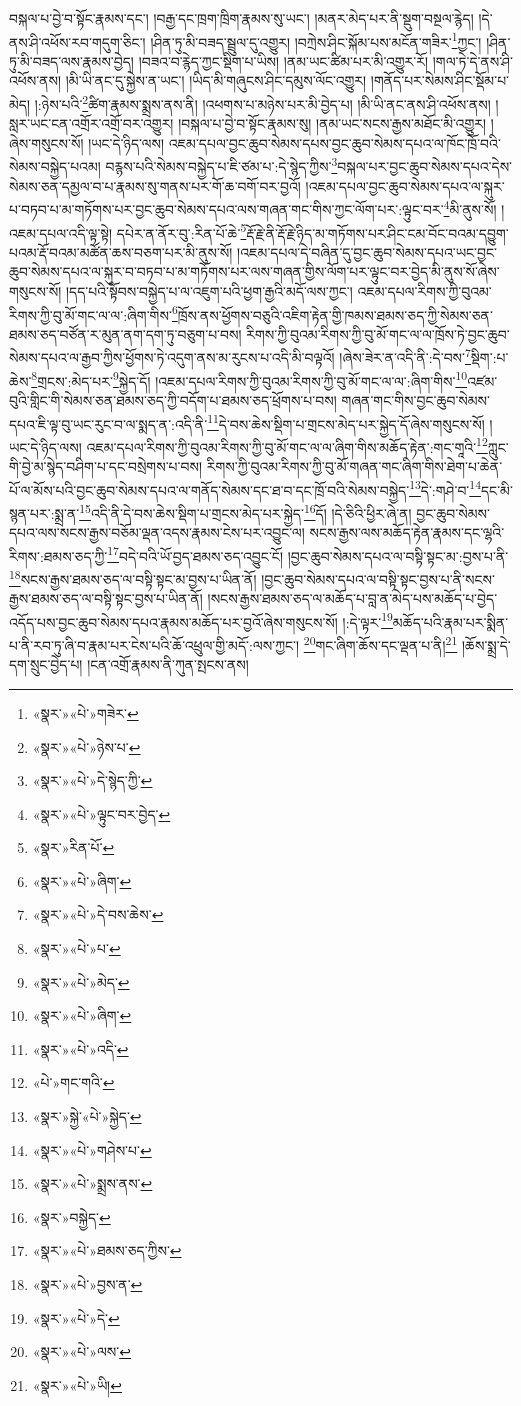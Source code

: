བསྐལ་པ་བྱེ་བ་སྟོང་རྣམས་དང་། །བརྒྱ་དང་ཁྲག་ཁྲིག་རྣམས་སུ་ཡང་། །མནར་མེད་པར་ནི་སྡུག་བསྔལ་རྙེད། །དེ་ནས་ཤི་འཕོས་རབ་གདུག་ཅིང་། །ཤིན་ཏུ་མི་བཟད་སྦྲུལ་དུ་འགྱུར། །བཀྲེས་ཤིང་སྐོམ་པས་མངོན་གཟིར་\footnote{«སྣར་»«པེ་»གཟེར་}ཀྱང་། །ཤིན་ཏུ་མི་བཟད་ལས་རྣམས་བྱེད། །བཟའ་བ་རྙེད་ཀྱང་སྡིག་པ་ཡིས། །ནམ་ཡང་ཚིམ་པར་མི་འགྱུར་རོ། །གལ་ཏེ་དེ་ནས་ཤི་འཕོས་ནས། །མི་ཡི་ནང་དུ་སྐྱེས་ན་ཡང་། །ཡིད་མི་གཞུངས་ཤིང་དམུས་ལོང་འགྱུར། །གནོད་པར་སེམས་ཤིང་སྡོམ་པ་མེད། །:ཉེས་པའི་\footnote{«སྣར་»«པེ་»ཉེས་པ་}ཚིག་རྣམས་སྨྲས་ནས་ནི། །འཕགས་པ་མཉེས་པར་མི་བྱེད་པ། །མི་ཡི་ནང་ནས་ཤི་འཕོས་ནས། །སླར་ཡང་ངན་འགྲོར་འགྲོ་བར་འགྱུར། །བསྐལ་པ་བྱེ་བ་སྟོང་རྣམས་སུ། །ནམ་ཡང་སངས་རྒྱས་མཐོང་མི་འགྱུར། །ཞེས་གསུངས་སོ། །ཡང་དེ་ཉིད་ལས། འཇམ་དཔལ་བྱང་ཆུབ་སེམས་དཔས་བྱང་ཆུབ་སེམས་དཔའ་ལ་ཁོང་ཁྲོ་བའི་སེམས་བསྐྱེད་པའམ། བརྙས་པའི་སེམས་བསྐྱེད་པ་ཇི་ཙམ་པ་:དེ་སྙེད་ཀྱིས་\footnote{«སྣར་»«པེ་»དེ་སྙེད་ཀྱི་}བསྐལ་པར་བྱང་ཆུབ་སེམས་དཔའ་དེས་སེམས་ཅན་དམྱལ་བ་པ་རྣམས་སུ་གནས་པར་གོ་ཆ་བགོ་བར་བྱའོ། །འཇམ་དཔལ་བྱང་ཆུབ་སེམས་དཔའ་ལ་སྐུར་པ་བཏབ་པ་མ་གཏོགས་པར་བྱང་ཆུབ་སེམས་དཔའ་ལས་གཞན་གང་གིས་ཀྱང་ལོག་པར་:ལྟུང་བར་\footnote{«སྣར་»«པེ་»ལྟུང་བར་བྱེད་}མི་ནུས་སོ། །འཇམ་དཔལ་འདི་ལྟ་སྟེ། དཔེར་ན་ནོར་བུ་:རིན་པོ་ཆེ་\footnote{«སྣར་»རིན་པོ་}རྡོ་རྗེ་ནི་རྡོ་རྗེ་ཉིད་མ་གཏོགས་པར་ཤིང་ངམ་བོང་བའམ་དབྱུག་པའམ་རྡོ་བའམ་མཚོན་ཆས་བཅག་པར་མི་ནུས་སོ། །འཇམ་དཔལ་དེ་བཞིན་དུ་བྱང་ཆུབ་སེམས་དཔའ་ཡང་བྱང་ཆུབ་སེམས་དཔའ་ལ་སྐུར་བ་བཏབ་པ་མ་གཏོགས་པར་ལས་གཞན་གྱིས་ལོག་པར་ལྟུང་བར་བྱེད་མི་ནུས་སོ་ཞེས་གསུངས་སོ། །དད་པའི་སྟོབས་བསྐྱེད་པ་ལ་འཇུག་པའི་ཕྱག་རྒྱའི་མདོ་ལས་ཀྱང་། འཇམ་དཔལ་རིགས་ཀྱི་བུའམ་རིགས་ཀྱི་བུ་མོ་གང་ལ་ལ་:ཞིག་གིས་\footnote{«སྣར་»«པེ་»ཞིག་}ཁྲོས་ནས་ཕྱོགས་བཅུའི་འཇིག་རྟེན་གྱི་ཁམས་ཐམས་ཅད་ཀྱི་སེམས་ཅན་ཐམས་ཅད་བཙོན་ར་མུན་ནག་དག་ཏུ་བཅུག་པ་བས། རིགས་ཀྱི་བུའམ་རིགས་ཀྱི་བུ་མོ་གང་ལ་ལ་ཁྲོས་ཏེ་བྱང་ཆུབ་སེམས་དཔའ་ལ་རྒྱབ་ཀྱིས་ཕྱོགས་ཏེ་འདུག་ནས་མ་རུངས་པ་འདི་མི་བལྟའོ། །ཞེས་ཟེར་ན་འདི་ནི་:དེ་བས་\footnote{«སྣར་»«པེ་»དེ་བས་ཆེས་}སྡིག་:པ་ཆེས་\footnote{«སྣར་»«པེ་»པ་}གྲངས་:མེད་པར་\footnote{«སྣར་»«པེ་»མེད་}སྐྱེད་དོ། །འཇམ་དཔལ་རིགས་ཀྱི་བུའམ་རིགས་ཀྱི་བུ་མོ་གང་ལ་ལ་:ཞིག་གིས་\footnote{«སྣར་»«པེ་»ཞིག་}འཛམ་བུའི་གླིང་གི་སེམས་ཅན་ཐམས་ཅད་ཀྱི་བདོག་པ་ཐམས་ཅད་ཕྲོགས་པ་བས། གཞན་གང་གིས་བྱང་ཆུབ་སེམས་དཔའ་ཇི་ལྟ་བུ་ཡང་རུང་བ་ལ་སྨད་ན་:འདི་ནི་\footnote{«སྣར་»«པེ་»འདི་}དེ་བས་ཆེས་སྡིག་པ་གྲངས་མེད་པར་སྐྱེད་དོ་ཞེས་གསུངས་སོ། །ཡང་དེ་ཉིད་ལས། འཇམ་དཔལ་རིགས་ཀྱི་བུའམ་རིགས་ཀྱི་བུ་མོ་གང་ལ་ལ་ཞིག་གིས་མཆོད་རྟེན་:གང་གཱའི་\footnote{«པེ་»གང་གའི་}ཀླུང་གི་བྱེ་མ་སྙེད་བཤིག་པ་དང་བསྲེགས་པ་བས། རིགས་ཀྱི་བུའམ་རིགས་ཀྱི་བུ་མོ་གཞན་གང་ཞིག་གིས་ཐེག་པ་ཆེན་པོ་ལ་མོས་པའི་བྱང་ཆུབ་སེམས་དཔའ་ལ་གནོད་སེམས་དང་ཐ་བ་དང་ཁྲོ་བའི་སེམས་བསྐྱེད་\footnote{«སྣར་»སྐྱེ་«པེ་»སྐྱེད་}དེ་:གཤེ་བ་\footnote{«སྣར་»«པེ་»གཤེས་པ་}དང་མི་སྙན་པར་:སྨྲ་ན་\footnote{«སྣར་»«པེ་»སྨྲས་ནས་}འདི་ནི་དེ་བས་ཆེས་སྡིག་པ་གྲངས་མེད་པར་སྐྱེད་\footnote{«སྣར་»བསྐྱེད་}དོ། །དེ་ཅིའི་ཕྱིར་ཞེ་ན། བྱང་ཆུབ་སེམས་དཔའ་ལས་སངས་རྒྱས་བཅོམ་ལྡན་འདས་རྣམས་ངེས་པར་འབྱུང་ལ། སངས་རྒྱས་ལས་མཆོད་རྟེན་རྣམས་དང་ལྷའི་རིགས་:ཐམས་ཅད་ཀྱི་\footnote{«སྣར་»«པེ་»ཐམས་ཅད་ཀྱིས་}བདེ་བའི་ཡོ་བྱད་ཐམས་ཅད་འབྱུང་ངོ། །བྱང་ཆུབ་སེམས་དཔའ་ལ་བསྟི་སྟང་མ་:བྱས་པ་ནི་\footnote{«སྣར་»«པེ་»བྱས་ན་}སངས་རྒྱས་ཐམས་ཅད་ལ་བསྟི་སྟང་མ་བྱས་པ་ཡིན་ནོ། །བྱང་ཆུབ་སེམས་དཔའ་ལ་བསྟི་སྟང་བྱས་པ་ནི་སངས་རྒྱས་ཐམས་ཅད་ལ་བསྟི་སྟང་བྱས་པ་ཡིན་ནོ། །སངས་རྒྱས་ཐམས་ཅད་ལ་མཆོད་པ་བླ་ན་མེད་པས་མཆོད་པ་བྱེད་འདོད་པས་བྱང་ཆུབ་སེམས་དཔའ་རྣམས་མཆོད་པར་བྱའོ་ཞེས་གསུངས་སོ། །:དེ་ལྟར་\footnote{«སྣར་»«པེ་»དེ་}མཆོད་པའི་རྣམ་པར་སྨིན་པ་ནི་རབ་ཏུ་ཞི་བ་རྣམ་པར་ངེས་པའི་ཆོ་འཕྲུལ་གྱི་མདོ་:ལས་ཀྱང་། \footnote{«སྣར་»«པེ་»ལས་}གང་ཞིག་ཆོས་དང་ལྡན་པ་ནི།\footnote{«སྣར་»«པེ་»ཡི།} །ཆོས་སྨྲ་དེ་དག་སྲུང་བྱེད་པ། །ངན་འགྲོ་རྣམས་ནི་ཀུན་སྤངས་ནས། 
